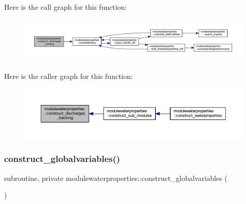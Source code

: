 Here is the call graph for this function\+:\nopagebreak
\begin{figure}[H]
\begin{center}
\leavevmode
\includegraphics[width=350pt]{namespacemodulewaterproperties_a30c3709afcaafdcec85f3efda5a73d03_cgraph}
\end{center}
\end{figure}
Here is the caller graph for this function\+:\nopagebreak
\begin{figure}[H]
\begin{center}
\leavevmode
\includegraphics[width=350pt]{namespacemodulewaterproperties_a30c3709afcaafdcec85f3efda5a73d03_icgraph}
\end{center}
\end{figure}
\mbox{\label{namespacemodulewaterproperties_a23995dd394222f8d9f2a52604e119d73}} 
\subsubsection{\texorpdfstring{construct\+\_\+globalvariables()}{construct\_globalvariables()}}
{\footnotesize\ttfamily subroutine, private modulewaterproperties\+::construct\+\_\+globalvariables (\begin{DoxyParamCaption}{ }\end{DoxyParamCaption})\hspace{0.3cm}{\ttfamily [private]}}

